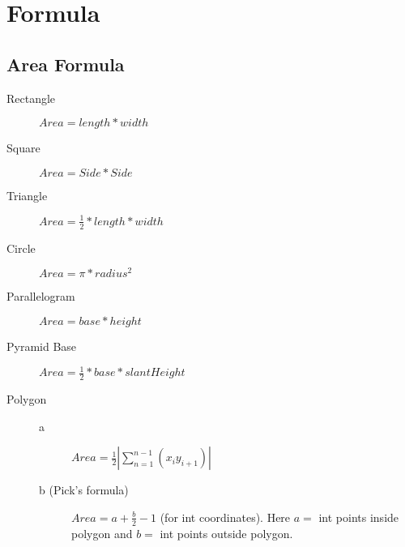 \documentclass[10pt, a4paper,twocolumn]{article}
\begin{document}
\section{Formula}
\subsection{Area Formula}
\begin{description}
    \item[Rectangle] 
        \begin{math}
            Area = length * width
        \end{math}
    \item[Square] 
        \begin{math}
            Area = Side * Side
        \end{math}
    \item[Triangle] 
        \begin{math}
            Area = \frac{1}{2} * length * width
        \end{math}
    \item[Circle] 
        \begin{math}
            Area = \pi * radius^2
        \end{math}
    \item[Parallelogram] 
        \begin{math}
            Area = base * height
        \end{math}
    \item[Pyramid Base] 
        \begin{math}
            Area = \frac{1}{2} * base * slantHeight
        \end{math}
    \item[Polygon] \hfill
        \begin{description}
            \item[a] 
            \begin{math}
                Area = \frac{1}{2}|\sum_{n=1}^{n-1}(x_iy_{i+1})|
            \end{math}

            \item[b (Pick's formula)] 
            \begin{math}
                Area = a + \frac{b}{2} - 1
            \end{math}
            (for int coordinates). Here $a=$ int points inside polygon and $b=$ int points outside polygon. 
        \end{description}
        
\end{description}
\end{document}
